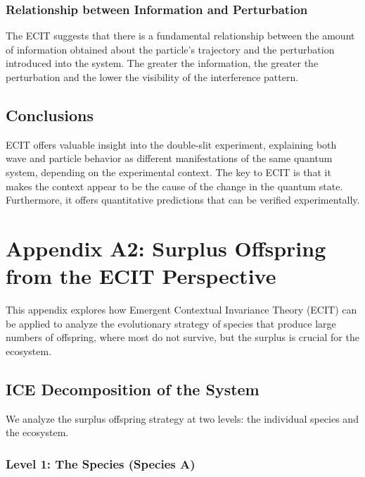 \documentclass{article}
\begin{document}
\subsubsection{Relationship between Information and Perturbation}

The ECIT suggests that there is a fundamental relationship between the amount of information obtained about the particle's trajectory and the perturbation introduced into the system. The greater the information, the greater the perturbation and the lower the visibility of the interference pattern.

\subsection{Conclusions}

ECIT offers valuable insight into the double-slit experiment, explaining both wave and particle behavior as different manifestations of the same quantum system, depending on the experimental context. The key to ECIT is that it makes the context appear to be the cause of the change in the quantum state. Furthermore, it offers quantitative predictions that can be verified experimentally.

\newpage
\maketitle

\section{Appendix A2: Surplus Offspring from the ECIT Perspective}

This appendix explores how Emergent Contextual Invariance Theory (ECIT) can be applied to analyze the evolutionary strategy of species that produce large numbers of offspring, where most do not survive, but the surplus is crucial for the ecosystem.

\subsection{ICE Decomposition of the System}

We analyze the surplus offspring strategy at two levels: the individual species and the ecosystem.

\subsubsection{Level 1: The Species (Species A)}
\end{document}
